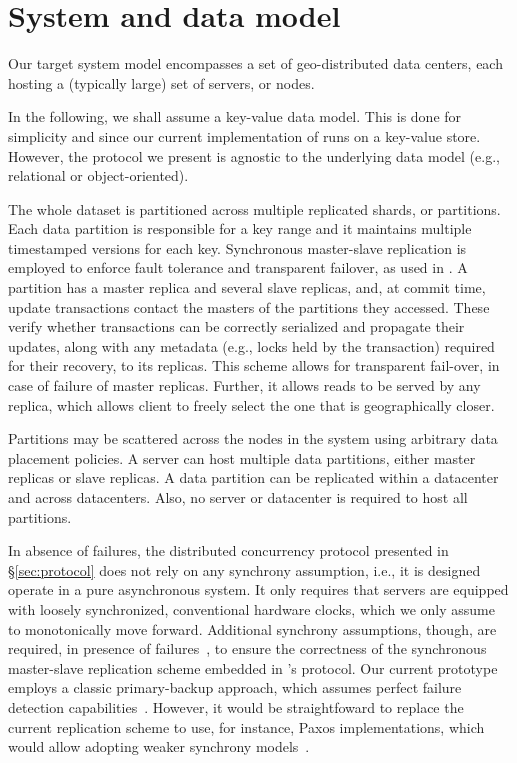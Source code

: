 \section{System  and data  model}
\label{sec:overview}

Our target system model encompasses a set of geo-distributed data centers, each hosting a (typically large) set of servers, or nodes. 

In the following, we shall assume a key-value data model. This is done for simplicity and since  our current implementation of \specula runs on a key-value store. However, the protocol we present  is agnostic to the underlying data model (e.g., relational or object-oriented). 

The whole dataset is partitioned across multiple replicated shards, or partitions.
Each data partition is responsible for a key range and it maintains multiple timestamped versions for each key.  Synchronous master-slave replication is employed to enforce fault tolerance and transparent failover, as used in \cite{spanner, baker2011megastore}. A partition has a master replica and several slave replicas, and, at commit time, update transactions contact the masters of the partitions they accessed. These verify whether transactions can be correctly serialized  and propagate their updates, along with any metadata (e.g., locks held by the transaction) required for their recovery, to its replicas.
This scheme allows for transparent fail-over, in case of failure of master replicas. Further, it allows reads to be served by any replica, which allows client to freely select the one that is geographically closer.


Partitions may be scattered across the nodes in the system using arbitrary data placement policies. A server can host multiple data partitions, either master replicas or slave replicas. A data partition can be replicated within a datacenter and across datacenters. Also, no server or datacenter is required to host all partitions. 

In absence of failures, the distributed concurrency protocol presented in \S \ref{sec:protocol} does not rely on any synchrony assumption, i.e., it is designed operate in a pure asynchronous system. It only requires that  servers are equipped with loosely synchronized, conventional hardware clocks, which we only assume to monotonically move forward. Additional synchrony assumptions, though, are required,  in presence of failures~\cite{FLP}, to ensure the correctness of the synchronous master-slave replication scheme embedded in \specula's protocol. Our current prototype employs a classic primary-backup approach, which assumes perfect failure detection capabilities~\cite{chandra-tueg-failure-detectors}. However, it would be straightfoward to replace the current replication scheme to use, for instance, Paxos implementations, which would allow adopting weaker synchrony models~\cite{partial-synchrony}.


